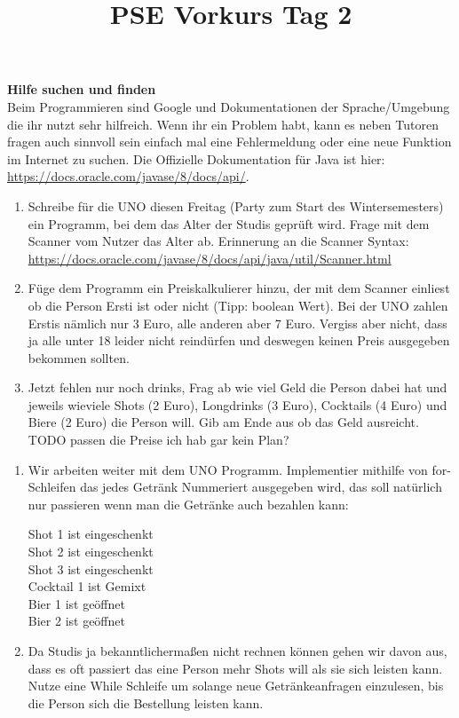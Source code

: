 \documentclass{../../sheet}
\title{PSE Vorkurs Tag 2}
\begin{document}
\maketitle

\textbf{Hilfe suchen und finden}\\
Beim Programmieren sind Google und Dokumentationen der Sprache/Umgebung die ihr nutzt sehr hilfreich. Wenn ihr ein Problem habt, kann es neben Tutoren fragen auch sinnvoll sein einfach mal eine Fehlermeldung oder eine neue Funktion im Internet zu suchen. Die Offizielle Dokumentation für Java ist hier: \url{https://docs.oracle.com/javase/8/docs/api/}.

\newpage
{}
\begin{enumerate}
    \item Schreibe für die UNO diesen Freitag (Party zum Start des Wintersemesters) ein Programm, bei dem das Alter der Studis geprüft wird. Frage mit dem Scanner vom Nutzer das Alter ab. Erinnerung an die Scanner Syntax:\\ \url{https://docs.oracle.com/javase/8/docs/api/java/util/Scanner.html}
    \item Füge dem Programm ein Preiskalkulierer hinzu, der mit dem Scanner einliest ob die Person Ersti ist oder nicht (Tipp: boolean Wert). Bei der UNO zahlen Erstis nämlich nur 3 Euro, alle anderen aber 7 Euro. Vergiss aber nicht, dass ja alle unter 18 leider nicht reindürfen und deswegen keinen Preis ausgegeben bekommen sollten.
    \item Jetzt fehlen nur noch drinks, Frag ab wie viel Geld die Person dabei hat und jeweils wieviele Shots (2 Euro), Longdrinks (3 Euro), Cocktails (4 Euro) und Biere (2 Euro) die Person will. Gib am Ende aus ob das Geld ausreicht.
          TODO passen die Preise ich hab gar kein Plan?
\end{enumerate}

\newpage
{}
\begin{enumerate}
    \item Wir arbeiten weiter mit dem UNO Programm. Implementier mithilfe von for-Schleifen das jedes Getränk Nummeriert ausgegeben wird, das soll natürlich nur passieren wenn man die Getränke auch bezahlen kann:
          \begin{ausgabe}
              Shot 1 ist  eingeschenkt\\
              Shot 2 ist  eingeschenkt\\
              Shot 3 ist  eingeschenkt\\
              Cocktail 1 ist  Gemixt\\
              Bier 1 ist geöffnet\\
              Bier 2 ist geöffnet
          \end{ausgabe}
    \item Da Studis ja bekanntlichermaßen nicht rechnen können gehen wir davon aus, dass es oft passiert das eine Person mehr Shots will als sie sich leisten kann. Nutze eine While Schleife um solange neue Getränkeanfragen einzulesen, bis die Person sich die Bestellung leisten kann.
\end{enumerate}
\end{document}
